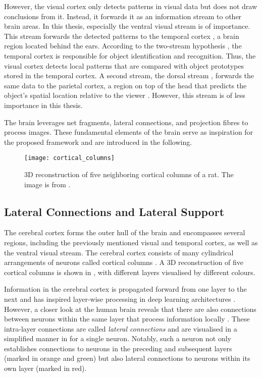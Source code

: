 However, the visual cortex only detects patterns in visual data but does not draw conclusions from it. Instead, it forwards it as an information stream to other brain areas. In this thesis, especially the ventral visual stream  is of importance. This stream forwards the detected patterns to the temporal cortex , a brain region located behind the ears.
According to the two-stream hypothesis \cite{goodale_separate_1992}, the temporal cortex is responsible for object identification and recognition.
Thus, the visual cortex detects local patterns that are compared with object prototypes stored in the temporal cortex.
A second stream, the dorsal stream \cite{goodale_separate_1992}, forwards the same data to the parietal cortex, a region on top of the head that predicts the object's spatial location relative to the viewer . However, this stream is of less importance in this thesis.

The brain leverages net fragments, lateral connections, and projection fibres to process images. These fundamental elements of the brain serve as inspiration for the proposed framework and are introduced in the following.

\begin{figure}[h]
    \centering
    \texttt{[image: cortical\_columns]}
    \caption[3D reconstruction of five neighbouring cortical columns]{3D reconstruction of five neighboring cortical columns of a rat. The image is from .}
\end{figure}

\subsection{Lateral Connections and Lateral Support}
The cerebral cortex forms the outer hull of the brain \cite{narr_relationships_2007} and encompasses several regions, including the previously mentioned visual and temporal cortex, as well as the ventral visual stream.
The cerebral cortex consists of many cylindrical arrangements of neurons called cortical columns .
A 3D reconstruction of five cortical columns is shown in , with different layers visualised by different colours.

Information in the cerebral cortex is propagated forward from one layer to the next and has inspired layer-wise processing in deep learning architectures .
However, a closer look at the human brain reveals that there are also connections between neurons within the same layer that process information locally .
These intra-layer connections are called \emph{lateral connections} and are visualised in a simplified manner in  for a single neuron.
Notably, such a neuron not only establishes connections to neurons in the preceding and subsequent layers (marked in orange and green) but also lateral connections to neurons within its own layer (marked in red).

